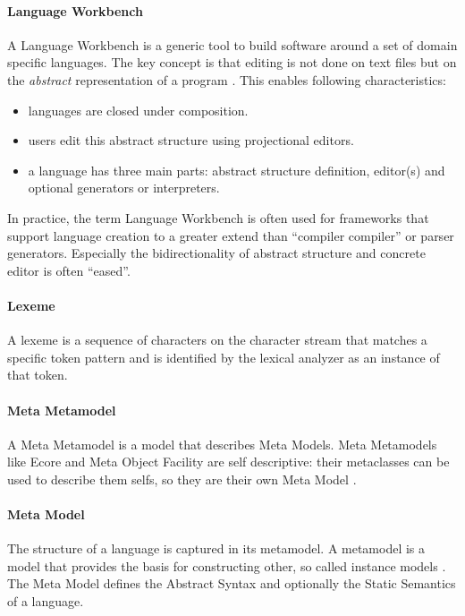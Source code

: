 \paragraph{Language Workbench}
A Language Workbench is a generic tool to build software around a set of domain specific languages. The key concept is that editing is not done on text files but on the \emph{abstract} representation of a program \cite{Fowler}. This enables following characteristics:
\begin{itemize}
	\item languages are closed under composition.
	\item users edit this abstract structure using projectional editors.
	\item a language has three main parts: abstract structure definition, editor(s) and optional generators or interpreters.
\end{itemize}
In practice, the term Language Workbench is often used for frameworks that support language creation to a greater extend than ``compiler compiler'' or parser generators. Especially the bidirectionality of abstract structure and concrete editor is often ``eased''. 

\paragraph{Lexeme}
A lexeme is a sequence of characters on the character stream that matches a specific token pattern and is identified by the lexical analyzer as an instance of that token. \cite{DragonBook}

\paragraph{Meta Metamodel} A Meta Metamodel is a model that describes Meta Models. Meta Metamodels like Ecore and Meta Object Facility are self descriptive: their metaclasses can be used to describe them selfs, so they are their own Meta Model \cite{EMF2nd}.

\paragraph{Meta Model} The structure of a language is captured in its metamodel. A metamodel is a model that provides the basis for constructing other, so called instance models \cite{EMP}. The Meta Model defines the Abstract Syntax and optionally the Static Semantics of a language. \cite{MDSD}

